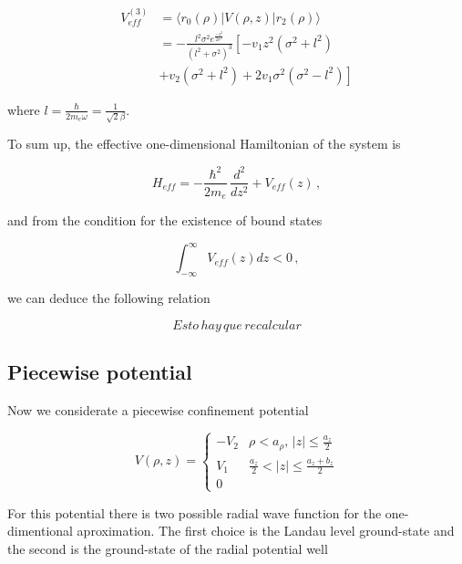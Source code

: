 \documentclass[a4paper,10pt]{article}
\begin{document}
\begin{equation}
  \begin{split}
    V_{eff}^{(3)} &= \langle r_0(\rho) \lvert V(\rho,z) \lvert r_2(\rho) \rangle \\
    &= -\frac{l^2\sigma^2 e^{\frac{-z^2}{2\sigma^2}}}{(l^2+\sigma^2)^3} \left[-v_1 z^2\left(\sigma^2 + l^2\right) \right.\\
    &\left.+ v_2 \left(\sigma^2 + l^2\right) + 2v_1\sigma^2 \left(\sigma^2 - l^2 \right) \right]
  \end{split}
\end{equation}

\noindent where $l = \frac{\hbar}{2 m_e \omega} = \frac{1}{\sqrt{2}\beta}$.

To sum up, the effective one-dimensional Hamiltonian of the system is

\begin{equation}
  H_{eff} = -\frac{\hbar^2}{2 m_e}\,\frac{d^2}{dz^2} + V_{eff}(z)\,,
\end{equation}

\noindent and from the condition for the existence of bound states

\begin{equation}
  \int_{-\infty}^{\infty} V_{eff}(z) dz < 0\,,
\end{equation}

\noindent we can deduce the following relation

\begin{equation}
  Esto\, hay\, que\, recalcular
\end{equation}

\subsection*{Piecewise potential}
Now we considerate a piecewise confinement potential

\begin{equation}
  V(\rho, z) = \left\{ \begin{matrix}
                         -V_2 & \rho<a_{\rho},\, |z|\leq\frac{a_z}{2} \\
                         V_1  & \frac{a_z}{2}< |z| \leq \frac{a_z + b_z}{2}\\
                         0
                       \end{matrix}\right.
\end{equation}

For this potential there is two possible radial wave function for the one-dimentional aproximation. The
first choice is the Landau level ground-state and the second is the ground-state of the radial potential well
\end{document}
